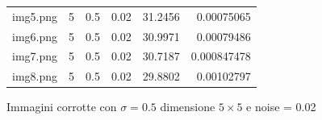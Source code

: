 \begin{figure}[H]
\begin{minipage}[h]{0.55\textwidth}
{\begin{tabular}{|l c c c c r|}
                img5.png & 5 & 0.5 & 0.02 & 31.2456 & 0.00075065 \\
                img6.png & 5 & 0.5 & 0.02 & 30.9971 & 0.00079486 \\
                img7.png & 5 & 0.5 & 0.02 & 30.7187 & 0.000847478\\
                img8.png & 5 & 0.5 & 0.02 & 29.8802 & 0.00102797 \\ \hline
        \end{tabular}\label{tab:tabcorrotte1}%
        }
    \end{minipage}%
    \begin{minipage}[h]{0.4\textwidth}
        \centering
    \end{minipage}
    \captionsetup{labelformat=andtable}
    \caption{Immagini corrotte con $\sigma = 0.5$ dimensione $5 \times 5$ e noise = 0.02}
\end{figure}

